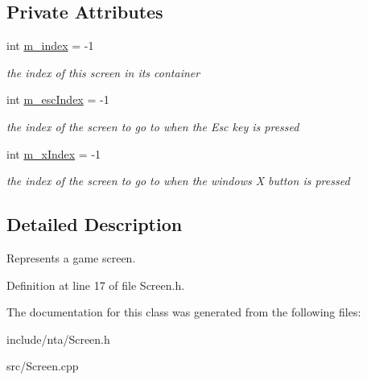 \subsection*{Private Attributes}
\begin{DoxyCompactItemize}
\item 
\mbox{\label{classnta_1_1Screen_a60c7a5b3894ec6f42042dac0f1f3c54c}} 
int \hyperlink{classnta_1_1Screen_a60c7a5b3894ec6f42042dac0f1f3c54c}{m\+\_\+index} = -\/1
\begin{DoxyCompactList}\small\item\em the index of this screen in its container \end{DoxyCompactList}\item 
\mbox{\label{classnta_1_1Screen_a5e38ecb4efb8ea6487774052f9d3281d}} 
int \hyperlink{classnta_1_1Screen_a5e38ecb4efb8ea6487774052f9d3281d}{m\+\_\+esc\+Index} = -\/1
\begin{DoxyCompactList}\small\item\em the index of the screen to go to when the Esc key is pressed \end{DoxyCompactList}\item 
\mbox{\label{classnta_1_1Screen_afba24e281f497022a32416f707785b9c}} 
int \hyperlink{classnta_1_1Screen_afba24e281f497022a32416f707785b9c}{m\+\_\+x\+Index} = -\/1
\begin{DoxyCompactList}\small\item\em the index of the screen to go to when the window\textquotesingle{}s X button is pressed \end{DoxyCompactList}\end{DoxyCompactItemize}


\subsection{Detailed Description}
Represents a game screen. 

Definition at line 17 of file Screen.\+h.



The documentation for this class was generated from the following files\+:\begin{DoxyCompactItemize}
\item 
include/nta/Screen.\+h\item 
src/Screen.\+cpp\end{DoxyCompactItemize}
